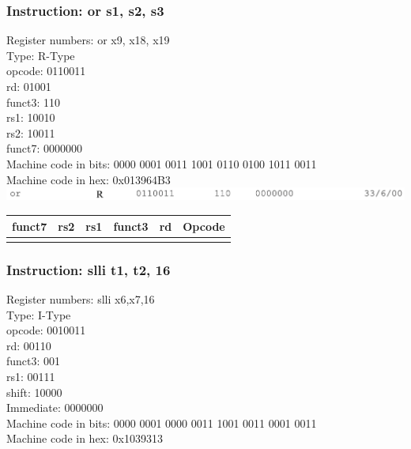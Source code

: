 \documentclass{article}
\begin{document}
\subsubsection*{Instruction: or  s1, s2, s3}
Register numbers: or x9, x18, x19\\
Type: R-Type\\
opcode: 0110011\\
rd: 01001\\
funct3: 110\\
rs1: 10010\\
rs2: 10011\\
funct7: 0000000\\
Machine code in bits: 0000 0001 0011 1001 0110 0100 1011 0011\\
Machine code in hex: 0x013964B3\\

\includegraphics[scale=.25]{images/or1.png}

\begin{center}
	\begin{tabularx}{1.15\textwidth} { 
		| >{\centering\arraybackslash}X 
		| >{\centering\arraybackslash}X 
		| >{\centering\arraybackslash}X 
		| >{\centering\arraybackslash}X
		| >{\centering\arraybackslash}X
		| >{\centering\arraybackslash}X | }
	   \hline
	   	funct7 & rs2 & rs1 & funct3 & rd & Opcode \\
	   \hline
	   0000000  & 10011  & 10010 & 110 & 01001 &  0110011\\
	  \hline
	\end{tabularx}
\end{center}


\subsubsection*{Instruction: slli  t1, t2, 16}
Register numbers: slli x6,x7,16\\
Type: I-Type\\
opcode: 0010011\\
rd: 00110\\
funct3: 001\\
rs1: 00111\\
shift: 10000\\
Immediate: 0000000\\
Machine code in bits: 0000 0001 0000 0011 1001 0011 0001 0011\\
Machine code in hex: 0x1039313\\
\end{document}
